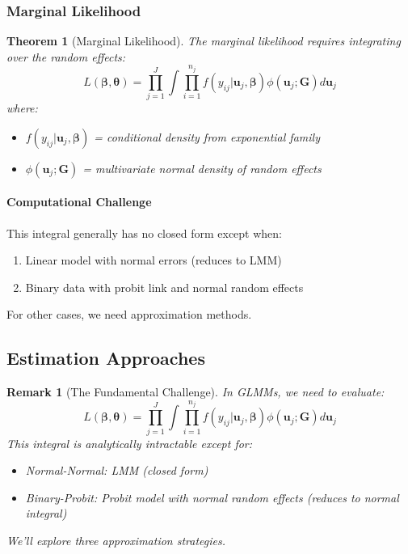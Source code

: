 \documentclass{article}
\newtheorem{theorem}{Theorem}
\newtheorem{remark}{Remark}
\begin{document}
\subsubsection{Marginal Likelihood}

\begin{theorem}[Marginal Likelihood]
The marginal likelihood requires integrating over the random effects:
\begin{equation}
L(\boldsymbol{\beta}, \boldsymbol{\theta}) = \prod_{j=1}^J \int \prod_{i=1}^{n_j} f(y_{ij}|\mathbf{u}_j, \boldsymbol{\beta}) \phi(\mathbf{u}_j; \mathbf{G}) d\mathbf{u}_j
\end{equation}
where:
\begin{itemize}
    \item $f(y_{ij}|\mathbf{u}_j, \boldsymbol{\beta})$ = conditional density from exponential family
    \item $\phi(\mathbf{u}_j; \mathbf{G})$ = multivariate normal density of random effects
\end{itemize}
\end{theorem}

\paragraph*{Computational Challenge}
This integral generally has no closed form except when:
\begin{enumerate}
    \item Linear model with normal errors (reduces to LMM)
    \item Binary data with probit link and normal random effects
\end{enumerate}
For other cases, we need approximation methods.

\subsection{Estimation Approaches}

\begin{remark}[The Fundamental Challenge]
In GLMMs, we need to evaluate:
\begin{equation}
L(\boldsymbol{\beta}, \boldsymbol{\theta}) = \prod_{j=1}^J \int \prod_{i=1}^{n_j} f(y_{ij}|\mathbf{u}_j, \boldsymbol{\beta}) \phi(\mathbf{u}_j; \mathbf{G}) d\mathbf{u}_j
\end{equation}
This integral is analytically intractable except for:
\begin{itemize}
    \item Normal-Normal: LMM (closed form)
    \item Binary-Probit: Probit model with normal random effects (reduces to normal integral)
\end{itemize}
We'll explore three approximation strategies.
\end{remark}
\end{document}
